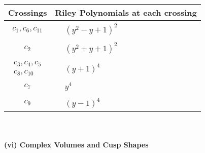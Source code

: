 \documentclass[1p]{elsarticle_modified}
\theoremstyle{definition}
\begin{document}
\begin{tabular}{m{50pt}|m{274pt}}
Crossings & \hspace{64pt}Riley Polynomials at each crossing \\
\hline $$\begin{aligned}c_{1},c_{6},c_{11}\end{aligned}$$&$\begin{aligned}
&(y^2- y+1)^2
\end{aligned}$\\
\hline $$\begin{aligned}c_{2}\end{aligned}$$&$\begin{aligned}
&(y^2+y+1)^2
\end{aligned}$\\
\hline $$\begin{aligned}c_{3},c_{4},c_{5}\\c_{8},c_{10}\end{aligned}$$&$\begin{aligned}
&(y+1)^4
\end{aligned}$\\
\hline $$\begin{aligned}c_{7}\end{aligned}$$&$\begin{aligned}
&y^4
\end{aligned}$\\
\hline $$\begin{aligned}c_{9}\end{aligned}$$&$\begin{aligned}
&(y-1)^4
\end{aligned}$\\
\hline
\end{tabular}\\~\\
\newpage\flushleft \textbf{(vi) Complex Volumes and Cusp Shapes}
\end{document}
